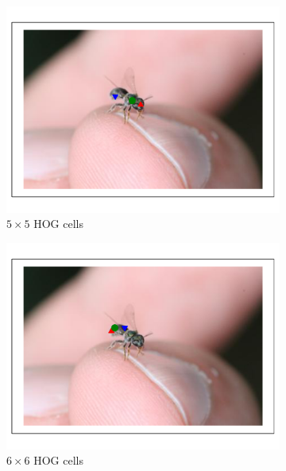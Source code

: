 \documentclass[11pt, oneside]{report}
\begin{document}
\begin{figure}[p]
\begin{subfigure}[b]{0.3\textwidth}
                \centering
                \includegraphics[width=\textwidth]{hog5_2.pdf}
                \caption{$5\times5$ HOG cells}
            \end{subfigure}
            \begin{subfigure}[b]{0.3\textwidth}
                \centering
                \includegraphics[width=\textwidth]{hog6_2.pdf}
                \caption{$6\times6$ HOG cells}
            \end{subfigure}
            \begin{subfigure}[b]{0.3\textwidth}
                \centering

\end{subfigure}
\end{figure}
\end{document}
